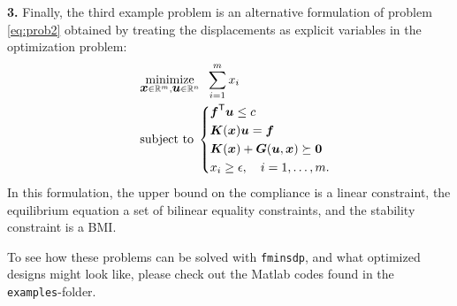 \documentclass{article}
\newcommand{\bm}[1]{\mbox{\boldmath $#1$}}
\newcommand{\T}{\textsf{T}}
\begin{document}
\vskip2mm
\noindent\textbf{3.} 
Finally, the third example problem is an alternative formulation of problem \eqref{eq:prob2} obtained by treating the displacements as explicit variables in the optimization problem:
\begin{equation}\nonumber
\quad
	\begin{aligned}
	&	\underset{\bm{x}\in\mathbb{R}^{m},\bm{u}\in\mathbb{R}^{n}}{\mbox{minimize}} \;\; \sum_{i=1}^{m}x_{i} \\
	&	\mbox{subject to} \;
	\left\{
		\begin{aligned}
		  & \bm{f}^{\T}\bm{u} \leq c \\
		  & \bm{K}(\bm{x})\bm{u} = \bm{f} \\
			& \bm{K}(\bm{x}) + \bm{G}(\bm{u},\bm{x}) \succeq \bm{0} \\
			& x_{i} \geq \epsilon , \quad i=1,\ldots,m.
		\end{aligned}
		\right.
	\end{aligned}
\end{equation}
In this formulation, the upper bound on the compliance is a linear constraint, the equilibrium equation a set of bilinear equality constraints,
and the stability constraint is a BMI.

\vskip 5mm
\noindent To see how these problems can be solved with \texttt{fminsdp}, and what optimized designs might look like, please check out the Matlab codes found in the \texttt{examples}-folder.


\newpage


\end{document}
